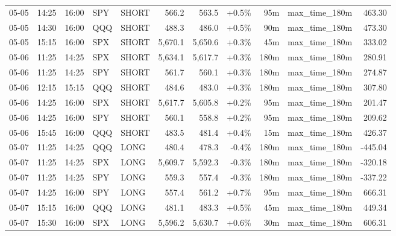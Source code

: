\documentclass[11pt,a4paper,twoside]{article}
\begin{document}
\begin{center}
\begin{longtable}{>{\color{txtmain}}l l l l l r r r r >{\color{txtmain}}l r}
05-05 & 14:25 & 16:00 & SPY & SHORT & 566.2 & 563.5 & \textcolor{wingreen}{+0.5\%} & 95m & max\_time\_180m & \textcolor{wingreen}{463.30} \\
05-05 & 14:30 & 16:00 & QQQ & SHORT & 488.3 & 486.0 & \textcolor{wingreen}{+0.5\%} & 90m & max\_time\_180m & \textcolor{wingreen}{473.30} \\
05-05 & 15:15 & 16:00 & SPX & SHORT & 5,670.1 & 5,650.6 & \textcolor{wingreen}{+0.3\%} & 45m & max\_time\_180m & \textcolor{wingreen}{333.02} \\
05-06 & 11:25 & 14:25 & SPX & SHORT & 5,634.1 & 5,617.7 & \textcolor{wingreen}{+0.3\%} & 180m & max\_time\_180m & \textcolor{wingreen}{280.91} \\
05-06 & 11:25 & 14:25 & SPY & SHORT & 561.7 & 560.1 & \textcolor{wingreen}{+0.3\%} & 180m & max\_time\_180m & \textcolor{wingreen}{274.87} \\
05-06 & 12:15 & 15:15 & QQQ & SHORT & 484.6 & 483.0 & \textcolor{wingreen}{+0.3\%} & 180m & max\_time\_180m & \textcolor{wingreen}{307.80} \\
05-06 & 14:25 & 16:00 & SPX & SHORT & 5,617.7 & 5,605.8 & \textcolor{wingreen}{+0.2\%} & 95m & max\_time\_180m & \textcolor{wingreen}{201.47} \\
05-06 & 14:25 & 16:00 & SPY & SHORT & 560.1 & 558.8 & \textcolor{wingreen}{+0.2\%} & 95m & max\_time\_180m & \textcolor{wingreen}{209.62} \\
05-06 & 15:45 & 16:00 & QQQ & SHORT & 483.5 & 481.4 & \textcolor{wingreen}{+0.4\%} & 15m & max\_time\_180m & \textcolor{wingreen}{426.37} \\
05-07 & 11:25 & 14:25 & QQQ & LONG & 480.4 & 478.3 & \textcolor{lossred}{-0.4\%} & 180m & max\_time\_180m & \textcolor{lossred}{-445.04} \\
05-07 & 11:25 & 14:25 & SPX & LONG & 5,609.7 & 5,592.3 & \textcolor{lossred}{-0.3\%} & 180m & max\_time\_180m & \textcolor{lossred}{-320.18} \\
05-07 & 11:25 & 14:25 & SPY & LONG & 559.3 & 557.4 & \textcolor{lossred}{-0.3\%} & 180m & max\_time\_180m & \textcolor{lossred}{-337.22} \\
05-07 & 14:25 & 16:00 & SPY & LONG & 557.4 & 561.2 & \textcolor{wingreen}{+0.7\%} & 95m & max\_time\_180m & \textcolor{wingreen}{666.31} \\
05-07 & 15:15 & 16:00 & QQQ & LONG & 481.1 & 483.3 & \textcolor{wingreen}{+0.5\%} & 45m & max\_time\_180m & \textcolor{wingreen}{449.34} \\
05-07 & 15:30 & 16:00 & SPX & LONG & 5,596.2 & 5,630.7 & \textcolor{wingreen}{+0.6\%} & 30m & max\_time\_180m & \textcolor{wingreen}{606.31} \\

\end{longtable}
\end{center}
\end{document}
